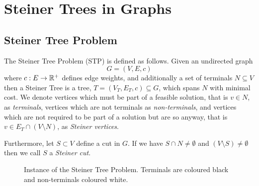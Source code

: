 \chapter{Steiner Trees in Graphs}
\label{chap:steiner-trees}

\section{Steiner Tree Problem}
The Steiner Tree Problem (STP) is defined as follows.
Given an undirected graph
$$G = (V, E, c)$$
 where $c: E \to \mathbb{R}^+$ defines edge weights, and additionally a set of terminals $N \subseteq V$ then
a Steiner Tree is a tree, $T = (V_T, E_T, c) \subseteq G$, which spans $N$ with minimal cost. We denote vertices which must be part of a feasible solution,
that is $v \in N$, as \textit{terminals}, vertices which are not terminals as \textit{non-terminals},
and vertices which are not required to be part of a solution but are so anyway, that is
$v \in E_T \cap (V \setminus N)$, as \textit{Steiner vertices}.

Furthermore, let $S \subset V$ define a cut in $G$. If we have $S \cap N \neq \emptyset$ and $(V \setminus S) \neq \emptyset$ then we
 call $S$ a \textit{Steiner cut}.

\begin{figure}[h]\centering
{}
\caption{Instance of the Steiner Tree Problem. Terminals are coloured black and non-terminals coloured white.}
\label{fig:stp:01}
\end{figure}

